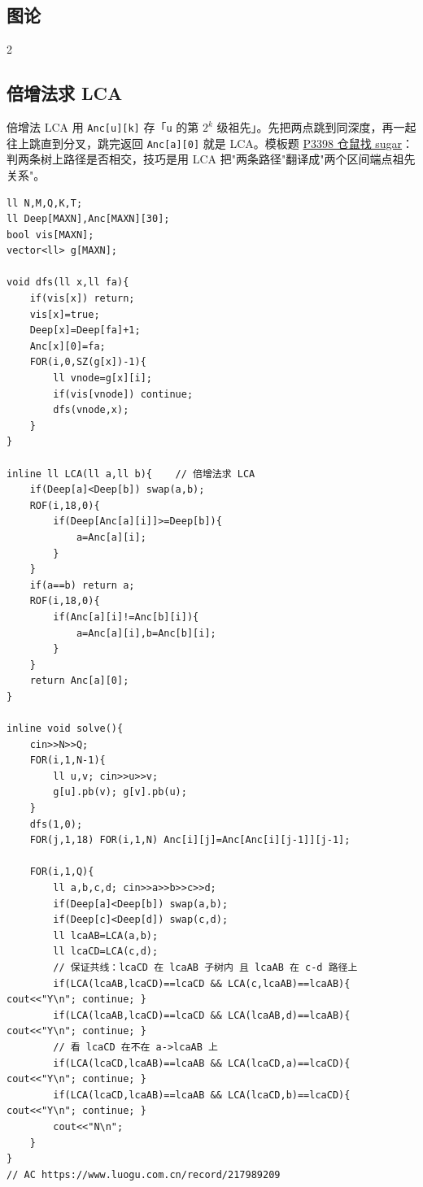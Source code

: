 	\begin{center}
		\section{图论}
	\end{center}

	\begin{multicols*}{2}

		\subsection{倍增法求 LCA}

		倍增法 LCA 用 \texttt{Anc[u][k]} 存「\texttt{u} 的第 $2^k$ 级祖先」。先把两点跳到同深度，再一起往上跳直到分叉，跳完返回 \texttt{Anc[a][0]} 就是 LCA。模板题 \href{https://www.luogu.com.cn/problem/P3398}{P3398 仓鼠找 sugar}：判两条树上路径是否相交，技巧是用 LCA 把"两条路径"翻译成"两个区间端点祖先关系"。

		\begin{verbatim}
ll N,M,Q,K,T;
ll Deep[MAXN],Anc[MAXN][30];
bool vis[MAXN];
vector<ll> g[MAXN];

void dfs(ll x,ll fa){
    if(vis[x]) return;
    vis[x]=true;
    Deep[x]=Deep[fa]+1;
    Anc[x][0]=fa;
    FOR(i,0,SZ(g[x])-1){
        ll vnode=g[x][i];
        if(vis[vnode]) continue;
        dfs(vnode,x);
    }
}

inline ll LCA(ll a,ll b){    // 倍增法求 LCA
    if(Deep[a]<Deep[b]) swap(a,b);
    ROF(i,18,0){
        if(Deep[Anc[a][i]]>=Deep[b]){
            a=Anc[a][i];
        }
    }
    if(a==b) return a;
    ROF(i,18,0){
        if(Anc[a][i]!=Anc[b][i]){
            a=Anc[a][i],b=Anc[b][i];
        }
    }
    return Anc[a][0];
}

inline void solve(){
    cin>>N>>Q;
    FOR(i,1,N-1){
        ll u,v; cin>>u>>v;
        g[u].pb(v); g[v].pb(u);
    }
    dfs(1,0);
    FOR(j,1,18) FOR(i,1,N) Anc[i][j]=Anc[Anc[i][j-1]][j-1];

    FOR(i,1,Q){
        ll a,b,c,d; cin>>a>>b>>c>>d;
        if(Deep[a]<Deep[b]) swap(a,b);
        if(Deep[c]<Deep[d]) swap(c,d);
        ll lcaAB=LCA(a,b);
        ll lcaCD=LCA(c,d);
        // 保证共线：lcaCD 在 lcaAB 子树内 且 lcaAB 在 c-d 路径上
        if(LCA(lcaAB,lcaCD)==lcaCD && LCA(c,lcaAB)==lcaAB){ cout<<"Y\n"; continue; }
        if(LCA(lcaAB,lcaCD)==lcaCD && LCA(lcaAB,d)==lcaAB){ cout<<"Y\n"; continue; }
        // 看 lcaCD 在不在 a->lcaAB 上
        if(LCA(lcaCD,lcaAB)==lcaAB && LCA(lcaCD,a)==lcaCD){ cout<<"Y\n"; continue; }
        if(LCA(lcaCD,lcaAB)==lcaAB && LCA(lcaCD,b)==lcaCD){ cout<<"Y\n"; continue; }
        cout<<"N\n";
    }
}
// AC https://www.luogu.com.cn/record/217989209
		\end{verbatim}



\end{multicols*}
